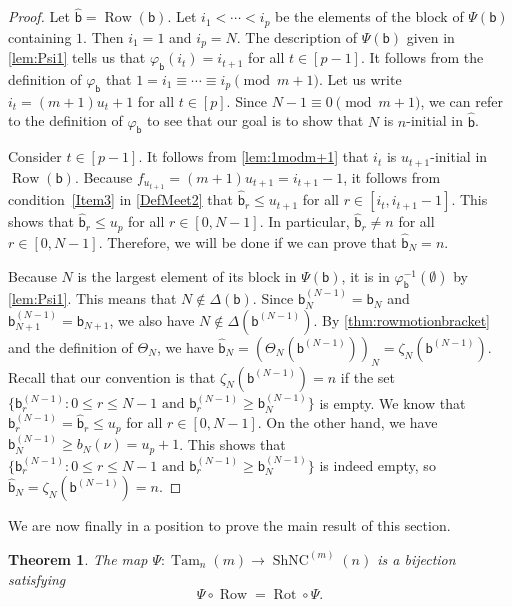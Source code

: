 \documentclass[11pt]{amsart}
\newtheorem{theorem}{Theorem}[section]
\theoremstyle{definition}
\DeclareMathOperator{\ShNC}{ShNC}
\DeclareMathOperator{\Tam}{Tam}
\DeclareMathOperator{\row}{Row}
\DeclareMathOperator{\Rot}{Rot}
\begin{document}
\begin{proof}
Let $\widehat{\mathsf b}=\row(\mathsf b)$. Let $i_1<\cdots<i_p$ be the elements of the block of $\Psi(\mathsf b)$ containing $1$. Then $i_1=1$ and $i_p=N$. The description of $\Psi(\mathsf b)$ given in \cref{lem:Psi1} tells us that $\varphi_{\mathsf b}(i_t)=i_{t+1}$ for all $t\in[p-1]$. It follows from the definition of $\varphi_{\mathsf b}$ that $1=i_1\equiv\cdots\equiv i_p\pmod{m+1}$. Let us write $i_t=(m+1)u_t+1$ for all $t\in[p]$. Since $N-1\equiv 0\pmod{m+1}$, we can refer to the definition of $\varphi_{\mathsf b}$ to see that our goal is to show that $N$ is $n$-initial in $\widehat{\mathsf b}$. 

Consider $t\in[p-1]$. It follows from \cref{lem:1modm+1} that $i_t$ is $u_{t+1}$-initial in $\row(\mathsf b)$. Because $f_{u_{t+1}}=(m+1)u_{t+1}=i_{t+1}-1$, it follows from condition~\eqref{Item3} in \cref{DefMeet2} that $\widehat{\mathsf b}_r\leq u_{t+1}$ for all $r\in[i_t,i_{t+1}-1]$. This shows that $\widehat{\mathsf b}_r\leq u_{p}$ for all $r\in[0,N-1]$. In particular, $\widehat{\mathsf b}_r\neq n$ for all $r\in[0,N-1]$. Therefore, we will be done if we can prove that $\widehat{\mathsf b}_N=n$.  

Because $N$ is the largest element of its block in $\Psi(\mathsf b)$, it is in $\varphi_{\mathsf b}^{-1}(\emptyset)$ by \cref{lem:Psi1}. This means that $N\not\in\Delta(\mathsf b)$. Since $\mathsf b^{(N-1)}_N=\mathsf b_N$ and $\mathsf b^{(N-1)}_{N+1}=\mathsf b_{N+1}$, we also have $N\not\in\Delta(\mathsf b^{(N-1)})$. By \cref{thm:rowmotionbracket} and the definition of $\Theta_N$, we have $\widehat{\mathsf b}_N=(\Theta_N(\mathsf b^{(N-1)}))_N=\zeta_N(\mathsf b^{(N-1)})$. Recall that our convention is that $\zeta_N(\mathsf b^{(N-1)})=n$ if the set $\{\mathsf b_r^{(N-1)}:0\leq r\leq N-1\text{ and }\mathsf b_r^{(N-1)}\geq \mathsf b_N^{(N-1)}\}$ is empty. We know that $\mathsf b^{(N-1)}_r=\widehat{\mathsf b}_r\leq u_p$ for all $r\in[0,N-1]$. On the other hand, we have $\mathsf b^{(N-1)}_N\geq b_N(\nu)=u_p+1$. This shows that $\{\mathsf b_r^{(N-1)}:0\leq r\leq N-1\text{ and }\mathsf b_r^{(N-1)}\geq \mathsf b_N^{(N-1)}\}$ is indeed empty, so $\widehat{\mathsf b}_N=\zeta_N(\mathsf b^{(N-1)})=n$. 
\end{proof}

We are now finally in a position to prove the main result of this section. 

\begin{theorem}\label{thm:nuTamariMain}
The map $\Psi\colon\Tam_n(m)\to\ShNC^{(m)}(n)$ is a bijection satisfying \[\Psi\circ\row=\Rot\circ\Psi.\] 
\end{theorem}
\end{document}
